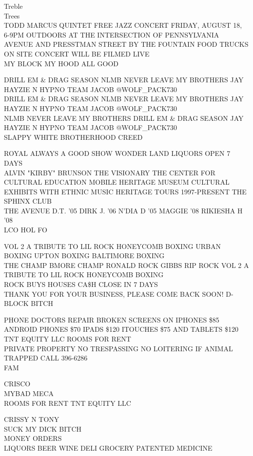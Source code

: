 \documentclass[10pt,letterpaper]{article}
\begin{document}
Treble\\
Trees\\
TODD MARCUS QUINTET FREE JAZZ CONCERT FRIDAY, AUGUST 18, 6{-}9PM OUTDOORS AT THE INTERSECTION OF PENNSYLVANIA AVENUE AND PRESSTMAN STREET BY THE FOUNTAIN FOOD TRUCKS ON SITE CONCERT WILL BE FILMED LIVE\\
MY BLOCK MY HOOD ALL GOOD

DRILL EM \& DRAG SEASON NLMB NEVER LEAVE MY BROTHERS JAY HAYZIE N HYPNO TEAM JACOB @WOLF\_PACK730\\
DRILL EM \& DRAG SEASON NLMB NEVER LEAVE MY BROTHERS JAY HAYZIE N HYPNO TEAM JACOB @WOLF\_PACK730\\
NLMB NEVER LEAVE MY BROTHERS DRILL EM \& DRAG SEASON JAY HAYZIE N HYPNO TEAM JACOB @WOLF\_PACK730\\
SLAPPY  WHITE BROTHERHOOD CREED

ROYAL ALWAYS A GOOD SHOW WONDER LAND LIQUORS OPEN 7 DAYS\\
ALVIN "KIRBY" BRUNSON THE VISIONARY THE CENTER FOR CULTURAL EDUCATION MOBILE HERITAGE MUSEUM CULTURAL EXHIBITS WITH ETHNIC MUSIC HERITAGE TOURS 1997{-}PRESENT THE SPHINX CLUB\\
THE AVENUE D.T. '05 DIRK J. '06 N'DIA D '05 MAGGIE '08 RIKIESHA H '08\\
LCO HOL FO

VOL 2 A TRIBUTE TO LIL ROCK HONEYCOMB BOXING URBAN BOXING UPTON BOXING BALTIMORE BOXING\\
THE CHAMP BMORE CHAMP RONALD ROCK GIBBS RIP ROCK VOL 2 A TRIBUTE TO LIL ROCK HONEYCOMB BOXING\\
ROCK BUYS HOUSES CA\$H CLOSE IN 7 DAYS\\
THANK YOU FOR YOUR BUSINESS, PLEASE COME BACK SOON!  D{-}BLOCK BITCH

PHONE DOCTORS REPAIR BROKEN SCREENS ON IPHONES \$85 ANDROID PHONES \$70 IPADS \$120 ITOUCHES \$75 AND TABLETS \$120\\
TNT EQUITY LLC ROOMS FOR RENT\\
PRIVATE PROPERTY NO TRESPASSING NO LOITERING IF ANIMAL TRAPPED CALL 396{-}6286\\
FAM

CRISCO\\
MYBAD MECA\\
ROOMS FOR RENT TNT EQUITY LLC

CRISSY N TONY\\
SUCK MY DICK BITCH\\
MONEY ORDERS\\
LIQUORS BEER WINE DELI GROCERY PATENTED MEDICINE
\end{document}
